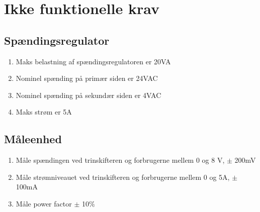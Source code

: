 
\section{Ikke funktionelle krav}

\subsection{Spændingsregulator}
\begin{enumerate}
	\item Maks belastning af spændingsregulatoren er 20VA
	\item Nominel spænding på primær siden er 24VAC
	\item Nominel spænding på sekundær siden er 4VAC
	\item Maks strøm er 5A	
\end{enumerate}

\subsection{Måleenhed}

\begin{enumerate}
	\item Måle spændingen ved trinskifteren og forbrugerne mellem 0 og 8 V, $\pm$ 200mV 
	\item Måle strømniveauet ved trinskifteren og forbrugerne mellem 0 og 5A, $\pm$ 100mA
	\item Måle power factor $\pm$ 10$\%$
\end{enumerate}





